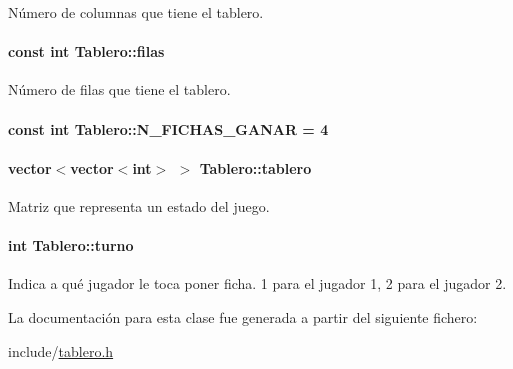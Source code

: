 Número de columnas que tiene el tablero. 

\hypertarget{classTablero_a6b1f04a8502106c33bf5469f791320e6}{
\paragraph[{filas}]{\setlength{\rightskip}{0pt plus 5cm}const int Tablero\-::filas\hspace{0.3cm}{\ttfamily [private]}}}\label{classTablero_a6b1f04a8502106c33bf5469f791320e6}


Número de filas que tiene el tablero. 

\hypertarget{classTablero_aa38ed353bef45bd6c5a2e3aa4a897720}{
\paragraph[{N\-\_\-\-F\-I\-C\-H\-A\-S\-\_\-\-G\-A\-N\-A\-R}]{\setlength{\rightskip}{0pt plus 5cm}const int Tablero\-::\-N\-\_\-\-F\-I\-C\-H\-A\-S\-\_\-\-G\-A\-N\-A\-R = 4\hspace{0.3cm}{\ttfamily [static]}}}\label{classTablero_aa38ed353bef45bd6c5a2e3aa4a897720}
\hypertarget{classTablero_a5df607d108c0c0a14aa4f393b7f43030}{
\paragraph[{tablero}]{\setlength{\rightskip}{0pt plus 5cm}vector$<$vector$<$int$>$ $>$ Tablero\-::tablero\hspace{0.3cm}{\ttfamily [private]}}}\label{classTablero_a5df607d108c0c0a14aa4f393b7f43030}


Matriz que representa un estado del juego. 

\hypertarget{classTablero_ae460b4a3245da075dd381365abf158bc}{
\paragraph[{turno}]{\setlength{\rightskip}{0pt plus 5cm}int Tablero\-::turno\hspace{0.3cm}{\ttfamily [private]}}}\label{classTablero_ae460b4a3245da075dd381365abf158bc}


Indica a qué jugador le toca poner ficha. 1 para el jugador 1, 2 para el jugador 2. 



La documentación para esta clase fue generada a partir del siguiente fichero\-:\begin{DoxyCompactItemize}
\item 
include/\hyperlink{tablero_8h}{tablero.\-h}\end{DoxyCompactItemize}
